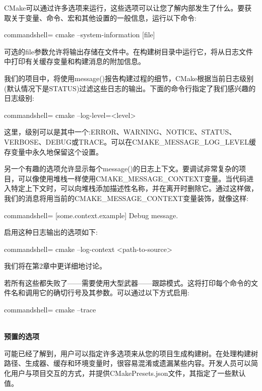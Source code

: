 CMake可以通过许多选项来运行，这些选项可以让您了解内部发生了什么。要获取关于变量、命令、宏和其他设置的一般信息，运行以下命令:

\begin{tcblisting}{commandshell={}}
cmake --system-information [file]
\end{tcblisting}

可选的file参数允许将输出存储在文件中。在构建树目录中运行它，将从日志文件中打印有关缓存变量和构建消息的附加信息。

我们的项目中，将使用message()报告构建过程的细节，CMake根据当前日志级别(默认情况下是STATUS)过滤这些日志的输出。下面的命令行指定了我们感兴趣的日志级别:

\begin{tcblisting}{commandshell={}}
cmake --log-level=<level>
\end{tcblisting}

这里，级别可以是其中一个:ERROR、WARNING、NOTICE、STATUS、VERBOSE、DEBUG或TRACE。可以在CMAKE\_MESSAGE\_LOG\_LEVEL缓存变量中永久地保留这个设置。

另一个有趣的选项允许显示每个message()的日志上下文。要调试非常复杂的项目，可以像使用堆栈一样使用CMAKE\_MESSAGE\_CONTEXT变量。当代码进入特定上下文时，可以向堆栈添加描述性名称，并在离开时删除它。通过这样做，我们的消息将用当前的CMAKE\_MESSAGE\_CONTEXT变量装饰，就像这样:

\begin{tcblisting}{commandshell={}}
[some.context.example] Debug message.
\end{tcblisting}

启用这种日志输出的选项如下:

\begin{tcblisting}{commandshell={}}
cmake --log-context <path-to-source>
\end{tcblisting}

我们将在第2章中更详细地讨论。

若所有这些都失败了——需要使用大型武器——跟踪模式。这将打印每个命令的文件名和调用它的确切行号及其参数。可以通过以下方式启用:

\begin{tcblisting}{commandshell={}}
cmake --trace
\end{tcblisting}

\hspace*{\fill} \\ %
\noindent
\textbf{预置的选项}

可能已经了解到，用户可以指定许多选项来从您的项目生成构建树。在处理构建树路径、生成器、缓存和环境变量时，很容易混淆或遗漏某些内容。开发人员可以简化用户与项目交互的方式，并提供CMakePresets.json文件，其指定了一些默认值。

